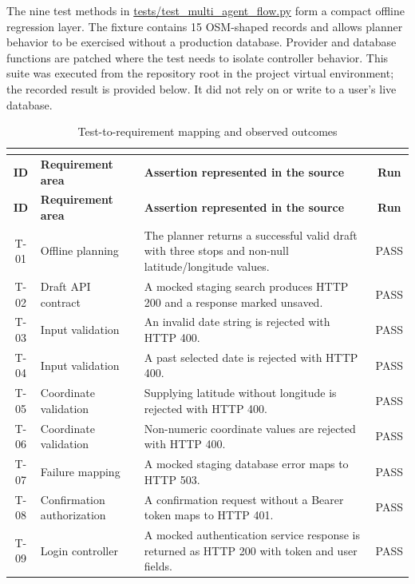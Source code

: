 The nine test methods in \url{tests/test_multi_agent_flow.py} form a compact offline regression layer. The fixture contains 15 OSM-shaped records and allows planner behavior to be exercised without a production database. Provider and database functions are patched where the test needs to isolate controller behavior. This suite was executed from the repository root in the project virtual environment; the recorded result is provided below. It did not rely on or write to a user's live database.

\begin{longtable}{c >{\raggedright\arraybackslash}p{4.4cm} >{\raggedright\arraybackslash}p{7.4cm} c}
\caption{Test-to-requirement mapping and observed outcomes}\\
\label{tab:test_mapping}\\
\toprule
\textbf{ID} & \textbf{Requirement area} & \textbf{Assertion represented in the source} & \textbf{Run} \\
\midrule
\endfirsthead
\toprule
\textbf{ID} & \textbf{Requirement area} & \textbf{Assertion represented in the source} & \textbf{Run} \\
\midrule
\endhead
T-01 & Offline planning & The planner returns a successful valid draft with three stops and non-null latitude/longitude values. & PASS \\
T-02 & Draft API contract & A mocked staging search produces HTTP 200 and a response marked unsaved. & PASS \\
T-03 & Input validation & An invalid date string is rejected with HTTP 400. & PASS \\
T-04 & Input validation & A past selected date is rejected with HTTP 400. & PASS \\
T-05 & Coordinate validation & Supplying latitude without longitude is rejected with HTTP 400. & PASS \\
T-06 & Coordinate validation & Non-numeric coordinate values are rejected with HTTP 400. & PASS \\
T-07 & Failure mapping & A mocked staging database error maps to HTTP 503. & PASS \\
T-08 & Confirmation authorization & A confirmation request without a Bearer token maps to HTTP 401. & PASS \\
T-09 & Login controller & A mocked authentication service response is returned as HTTP 200 with token and user fields. & PASS \\
\bottomrule
\end{longtable}

